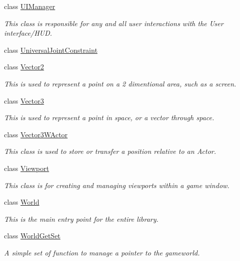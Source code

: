 \begin{DoxyCompactItemize}
class \hyperlink{classMezzanine_1_1UIManager}{UIManager}
\begin{DoxyCompactList}\small\item\em This class is responsible for any and all user interactions with the User interface/HUD. \item\end{DoxyCompactList}\item 
class \hyperlink{classMezzanine_1_1UniversalJointConstraint}{UniversalJointConstraint}
\item 
class \hyperlink{classMezzanine_1_1Vector2}{Vector2}
\begin{DoxyCompactList}\small\item\em This is used to represent a point on a 2 dimentional area, such as a screen. \item\end{DoxyCompactList}\item 
class \hyperlink{classMezzanine_1_1Vector3}{Vector3}
\begin{DoxyCompactList}\small\item\em This is used to represent a point in space, or a vector through space. \item\end{DoxyCompactList}\item 
class \hyperlink{classMezzanine_1_1Vector3WActor}{Vector3WActor}
\begin{DoxyCompactList}\small\item\em This class is used to store or transfer a position relative to an Actor. \item\end{DoxyCompactList}\item 
class \hyperlink{classMezzanine_1_1Viewport}{Viewport}
\begin{DoxyCompactList}\small\item\em This class is for creating and managing viewports within a game window. \item\end{DoxyCompactList}\item 
class \hyperlink{classMezzanine_1_1World}{World}
\begin{DoxyCompactList}\small\item\em This is the main entry point for the entire library. \item\end{DoxyCompactList}\item 
class \hyperlink{classMezzanine_1_1WorldGetSet}{WorldGetSet}
\begin{DoxyCompactList}\small\item\em A simple set of function to manage a pointer to the gameworld. \item\end{DoxyCompactList}\item 

\end{DoxyCompactItemize}
